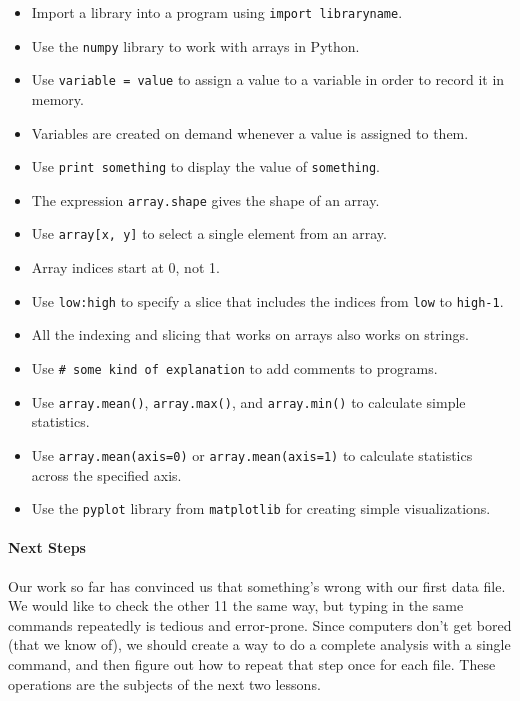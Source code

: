 \documentclass[]{book}
\begin{document}
\begin{itemize}
\item
  Import a library into a program using \texttt{import libraryname}.
\item
  Use the \texttt{numpy} library to work with arrays in Python.
\item
  Use \texttt{variable = value} to assign a value to a variable in order
  to record it in memory.
\item
  Variables are created on demand whenever a value is assigned to them.
\item
  Use \texttt{print something} to display the value of
  \texttt{something}.
\item
  The expression \texttt{array.shape} gives the shape of an array.
\item
  Use \texttt{array{[}x, y{]}} to select a single element from an array.
\item
  Array indices start at 0, not 1.
\item
  Use \texttt{low:high} to specify a slice that includes the indices
  from \texttt{low} to \texttt{high-1}.
\item
  All the indexing and slicing that works on arrays also works on
  strings.
\item
  Use \texttt{\# some kind of explanation} to add comments to programs.
\item
  Use \texttt{array.mean()}, \texttt{array.max()}, and
  \texttt{array.min()} to calculate simple statistics.
\item
  Use \texttt{array.mean(axis=0)} or \texttt{array.mean(axis=1)} to
  calculate statistics across the specified axis.
\item
  Use the \texttt{pyplot} library from \texttt{matplotlib} for creating
  simple visualizations.
\end{itemize}

\mbox{}\paragraph{Next Steps}

Our work so far has convinced us that something's wrong with our first
data file. We would like to check the other 11 the same way, but typing
in the same commands repeatedly is tedious and error-prone. Since
computers don't get bored (that we know of), we should create a way to
do a complete analysis with a single command, and then figure out how to
repeat that step once for each file. These operations are the subjects
of the next two lessons.
\end{document}
